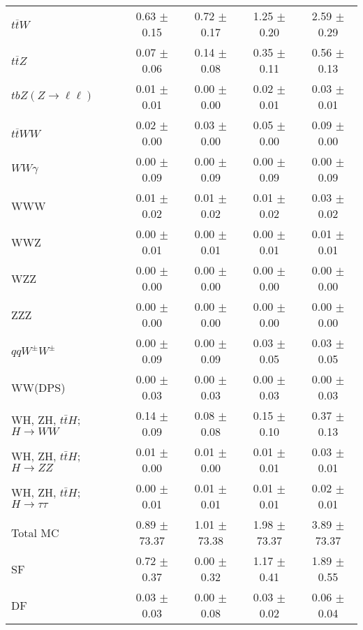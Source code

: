 \begin{tabular}{l|cccc}
                   $t\overline{t}W$ &  0.63 $\pm$  0.15 &  0.72 $\pm$  0.17 &  1.25 $\pm$  0.20 &  2.59 $\pm$  0.29 \\
                   $t\overline{t}Z$ &  0.07 $\pm$  0.06 &  0.14 $\pm$  0.08 &  0.35 $\pm$  0.11 &  0.56 $\pm$  0.13 \\
    $tbZ (Z \rightarrow \ell \ell)$ &  0.01 $\pm$  0.01 &  0.00 $\pm$  0.00 &  0.02 $\pm$  0.01 &  0.03 $\pm$  0.01 \\
                  $t\overline{t}WW$ &  0.02 $\pm$  0.00 &  0.03 $\pm$  0.00 &  0.05 $\pm$  0.00 &  0.09 $\pm$  0.00 \\
                         $WW\gamma$ &  0.00 $\pm$  0.09 &  0.00 $\pm$  0.09 &  0.00 $\pm$  0.09 &  0.00 $\pm$  0.09 \\
                                WWW &  0.01 $\pm$  0.02 &  0.01 $\pm$  0.02 &  0.01 $\pm$  0.02 &  0.03 $\pm$  0.02 \\
                                WWZ &  0.00 $\pm$  0.01 &  0.00 $\pm$  0.01 &  0.00 $\pm$  0.01 &  0.01 $\pm$  0.01 \\
                                WZZ &  0.00 $\pm$  0.00 &  0.00 $\pm$  0.00 &  0.00 $\pm$  0.00 &  0.00 $\pm$  0.00 \\
                                ZZZ &  0.00 $\pm$  0.00 &  0.00 $\pm$  0.00 &  0.00 $\pm$  0.00 &  0.00 $\pm$  0.00 \\
                 $qqW^{\pm}W^{\pm}$ &  0.00 $\pm$  0.09 &  0.00 $\pm$  0.09 &  0.03 $\pm$  0.05 &  0.03 $\pm$  0.05 \\
                            WW(DPS) &  0.00 $\pm$  0.03 &  0.00 $\pm$  0.03 &  0.00 $\pm$  0.03 &  0.00 $\pm$  0.03 \\
WH, ZH, $t\bar{t}H$; $H \rightarrow WW$ &  0.14 $\pm$  0.09 &  0.08 $\pm$  0.08 &  0.15 $\pm$  0.10 &  0.37 $\pm$  0.13 \\
WH, ZH, $t\bar{t}H$; $H \rightarrow ZZ$ &  0.01 $\pm$  0.00 &  0.01 $\pm$  0.00 &  0.01 $\pm$  0.01 &  0.03 $\pm$  0.01 \\
WH, ZH, $t\bar{t}H$; $H \rightarrow \tau\tau$ &  0.00 $\pm$  0.01 &  0.01 $\pm$  0.01 &  0.01 $\pm$  0.01 &  0.02 $\pm$  0.01 \\
\hline\hline
                           Total MC &  0.89 $\pm$ 73.37 &  1.01 $\pm$ 73.38 &  1.98 $\pm$ 73.37 &  3.89 $\pm$ 73.37 \\
\hline
                                 SF &  0.72 $\pm$  0.37 &  0.00 $\pm$  0.32 &  1.17 $\pm$  0.41 &  1.89 $\pm$  0.55 \\
                                 DF &  0.03 $\pm$  0.03 &  0.00 $\pm$  0.08 &  0.03 $\pm$  0.02 &  0.06 $\pm$  0.04 \\

\end{tabular}
